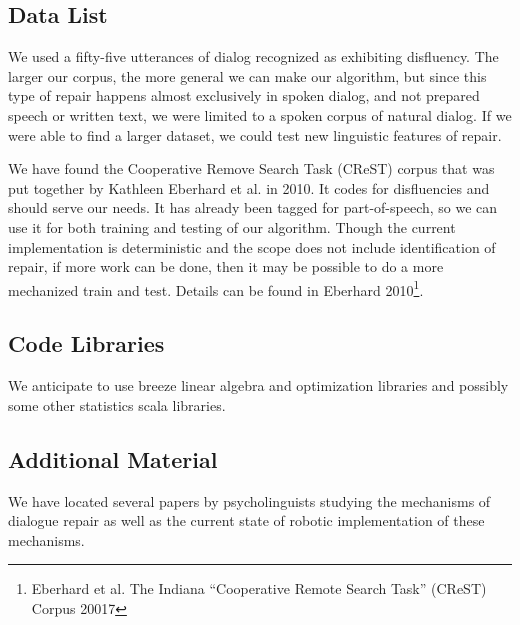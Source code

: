 \documentclass{article}
\begin{document}
\subsection{Data List}

\begin{flushleft}

We used a fifty-five utterances of dialog recognized as exhibiting disfluency. The larger our corpus, the more general we can make our algorithm, but since this type of repair happens almost exclusively in spoken dialog, and not prepared speech or written text, we were limited to a spoken corpus of natural dialog. If we were able to find a larger dataset, we could test new linguistic features of repair.

\end{flushleft}

\begin{flushleft}

  We have found the Cooperative Remove Search Task (CReST) corpus that was put together by Kathleen Eberhard et al. in 2010. It codes for disfluencies and should serve our needs. It has already been tagged for part-of-speech, so we can use it for both training and testing of our algorithm. Though the current implementation is deterministic and the scope does not include identification of repair, if more work can be done, then it may be possible to do a more mechanized train and test. Details can be found in Eberhard 2010\footnote{Eberhard et al. The Indiana ``Cooperative Remote Search Task'' (CReST) Corpus 20017}. 

\end{flushleft}

\subsection{Code Libraries}

\begin{flushleft}
We anticipate to use breeze linear algebra and optimization libraries and possibly some other statistics scala libraries.
\end{flushleft}

\subsection{Additional Material}

We have located several papers by psycholinguists studying the mechanisms of dialogue repair as well as the current state of robotic implementation of these mechanisms.
\end{document}
